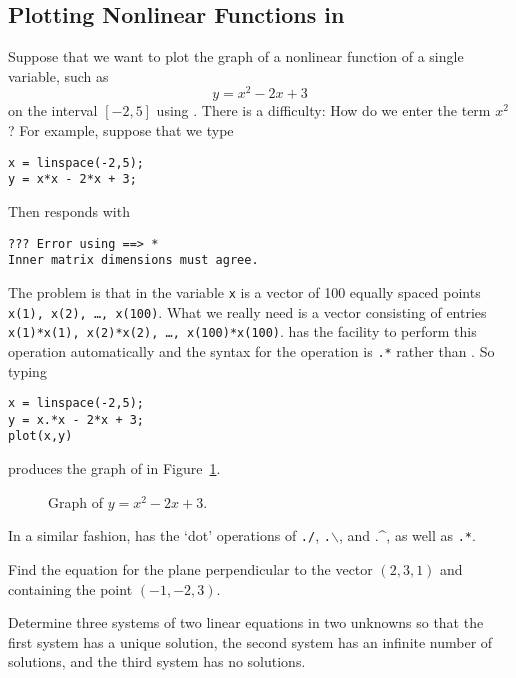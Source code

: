 \documentclass{ximera}
\begin{document}
\subsection*{Plotting Nonlinear Functions in \Matlab}

Suppose that we want to plot the graph of a nonlinear function of
a single variable, such as
\begin{equation}  \label{E:quadex}
y = x^2 - 2x + 3
\end{equation}
on the interval $[-2,5]$ using \Matlabp.  There is a difficulty:  How
do we enter the term $x^2$?  For example, suppose that we type
\begin{verbatim}
x = linspace(-2,5);
y = x*x - 2*x + 3;
\end{verbatim}
Then \Matlab responds with
\begin{verbatim}
??? Error using ==> *
Inner matrix dimensions must agree.
\end{verbatim}
The problem is that in \Matlab the variable {\tt x} is a vector of
100 equally spaced points {\tt x(1), x(2), \ldots, x(100)}.  What we
really need is a vector consisting of entries {\tt x(1)*x(1), x(2)*x(2),
\ldots, x(100)*x(100)}.  \Matlab has the facility to perform this
operation automatically and the syntax for the operation is {\tt .*}
rather than {\tt *}.  So typing
\begin{verbatim}
x = linspace(-2,5);
y = x.*x - 2*x + 3;
plot(x,y)
\end{verbatim}
produces the graph of  in Figure~\ref{F:quadex}.
\begin{figure}[htb]
              \centerline{%
              }
              \caption{Graph of $y = x^2 - 2x + 3$.}
              \label{F:quadex}
\end{figure}
In a similar fashion, \Matlab has the `dot' operations of
{\tt ./},
{\tt .$\backslash$}, and  .\^{}, as well
as {\tt .*}.

\EXER



\TEXER

\begin{exercise} \label{c2.2.5}
Find the equation for the plane perpendicular to the vector $(2,3,1)$
and containing the point $(-1,-2,3)$.
\end{exercise}

\begin{exercise} \label{c2.2.6}
Determine three systems of two linear equations in two unknowns
so that the first system has a unique solution, the second
system has an infinite number of solutions, and the third system
has no solutions.
\end{exercise}
\end{document}
